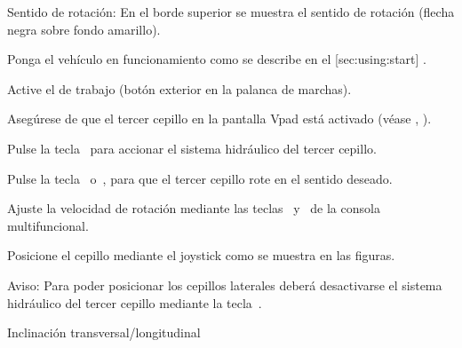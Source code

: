 {\md Sentido de rotación:} {\lt En el borde superior se muestra el sentido de rotación (flecha negra sobre fondo amarillo).}
\stopSymVpad

\stopsection






\startsection [title={Trabajar con el tercer cepillo (opción)},
reference={sec:using:frontBrush},
]

\startSteps
\item Ponga el vehículo en funcionamiento como se describe en el [sec:using:start] .
\item Active el \aWmodo de {trabajo} (botón exterior en la palanca de marchas).
\stopSteps


\startSteps [continue]
\item Asegúrese de que el tercer cepillo en la pantalla Vpad está activado (véase  , ).
\item Pulse la tecla~ para accionar el sistema hidráulico del tercer cepillo.
\item Pulse la tecla~ o~, para que el tercer cepillo rote en el sentido deseado.

\item Ajuste la velocidad de rotación mediante las teclas~ y~ de la consola multifuncional.

\item Posicione el cepillo mediante el joystick como se muestra en las figuras.

\stopSteps

{\md Aviso:} {\lt Para poder posicionar los cepillos laterales deberá desactivarse el sistema hidráulico del tercer cepillo mediante la tecla~.}
\vfill

\start
\setupcombinations [width=\textwidth]

{
{}{Inclinación transversal/longitudinal}
\stopcombination}
\stop



